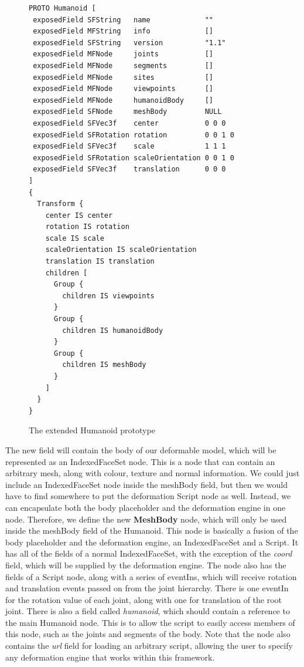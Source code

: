 \documentclass[10pt,oneside,fleqn,a4paper]{book}
\begin{document}
\begin{figure}[t]
\scriptsize
\begin{verbatim}
PROTO Humanoid [
 exposedField SFString   name             ""
 exposedField MFString   info             []
 exposedField SFString   version          "1.1"
 exposedField MFNode     joints           []
 exposedField MFNode     segments         []
 exposedField MFNode     sites            []
 exposedField MFNode     viewpoints       []
 exposedField MFNode     humanoidBody     []
 exposedField SFNode     meshBody         NULL
 exposedField SFVec3f    center           0 0 0
 exposedField SFRotation rotation         0 0 1 0
 exposedField SFVec3f    scale            1 1 1
 exposedField SFRotation scaleOrientation 0 0 1 0
 exposedField SFVec3f    translation      0 0 0
]
{
  Transform {
    center IS center
    rotation IS rotation
    scale IS scale
    scaleOrientation IS scaleOrientation
    translation IS translation
    children [
      Group {
        children IS viewpoints
      }
      Group {
        children IS humanoidBody
      }
      Group {
        children IS meshBody
      }
    ]
  }
}
\end{verbatim}
\caption{\label{fig:humanoidproto} The extended Humanoid prototype}
\end{figure}

The new field will contain the body of our deformable model, which will be represented as an IndexedFaceSet node. This is a node that can contain an arbitrary mesh, along with colour, texture and normal information. We could just include an IndexedFaceSet node inside the meshBody field, but then we would have to find somewhere to put the deformation Script node as well. Instead, we can encapsulate both the body placeholder and the deformation engine in one node. Therefore, we define the new {\bf MeshBody} node, which will only be used inside the meshBody field of the Humanoid. This node is basically a fusion of the body placeholder and the deformation engine, an IndexedFaceSet and a Script. It has all of the fields of a normal IndexedFaceSet, with the exception of the {\it coord} field, which will be supplied by the deformation engine. The node also has the fields of a Script node, along with a series of eventIns, which will receive rotation and translation events passed on from the joint hierarchy. There is one eventIn for the rotation value of each joint, along with one for translation of the root joint. There is also a field called {\it humanoid}, which should contain a reference to the main Humanoid node. This is to allow the script to easily access members of this node, such as the joints and segments of the body. Note that the node also contains the {\it url} field for loading an arbitrary script, allowing the user to specify any deformation engine that works within this framework.
\end{document}
